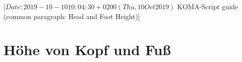 %
%
%
%
%
%
%
%
% 
%
%
%
%

                 [$Date: 2019-10-10 10:04:30 +0200 (Thu, 10 Oct 2019) $
                  KOMA-Script guide (common paragraph: Head and Foot Height)]




\section{Höhe von Kopf und Fuß}

